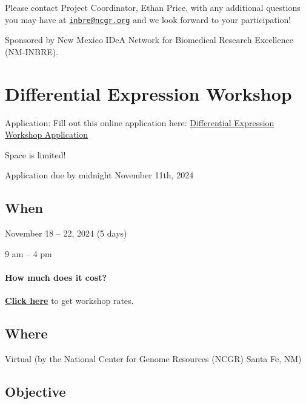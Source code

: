 \documentclass[
]{book}
\begin{document}
Please contact Project Coordinator, Ethan Price, with any additional questions you may have at \href{mailto:inbre@ncgr.org}{\nolinkurl{inbre@ncgr.org}} and we look forward to your participation!

Sponsored by New Mexico IDeA Network for Biomedical Research Excellence (NM-INBRE).

\hypertarget{differential-expression-workshop}{%
\chapter*{Differential Expression Workshop}\label{differential-expression-workshop}}

Application: Fill out this online application here:
\href{https://forms.gle/aXG2StdRnSfKAcfA6}{Differential Expression Workshop Application}

Space is limited!

Application due by midnight November 11th, 2024

\hypertarget{when-5}{%
\section*{When}\label{when-5}}

November 18 -- 22, 2024 (5 days)

9 am -- 4 pm

\hypertarget{how-much-does-it-cost-5}{%
\subsubsection*{How much does it cost?}\label{how-much-does-it-cost-5}}

\href{https://inbre.ncgr.org/ncgr-workshops/workshop-rates.html}{\textbf{Click here}} to get workshop rates.

\hypertarget{where-3}{%
\section*{Where}\label{where-3}}

Virtual (by the National Center for Genome Resources (NCGR) Santa Fe, NM)

\hypertarget{objective-3}{%
\section*{Objective}\label{objective-3}}
\end{document}
